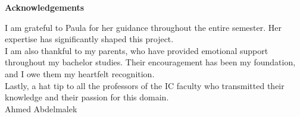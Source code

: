 
\thispagestyle{empty} %
\begin{center}
    \Large \textbf{Acknowledgements}\\[2cm]
\end{center}

\linespread{1.3}\selectfont %

\noindent
I am grateful to Paula for her guidance throughout the entire semester. Her expertise has significantly shaped this project.\\

\noindent
I am also thankful to my parents, who have provided emotional support throughout my bachelor studies. Their encouragement has been my foundation, and I owe them my heartfelt recognition.\\

\noindent
Lastly, a hat tip to all the professors of the IC faculty who transmitted their knowledge and their passion for this domain.\\[2cm]

\hfill Ahmed Abdelmalek %